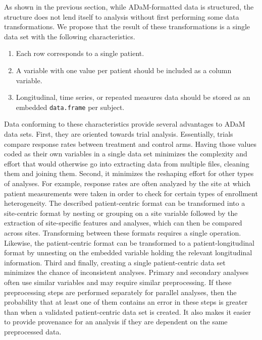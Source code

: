 As shown in the previous section, while ADaM-formatted data is
structured, the structure does not lend itself to analysis without first
performing some data transformations. We propose that the result of
these transformations is a single data set with the following
characteristics.

\begin{enumerate}
\def\labelenumi{\arabic{enumi}.}
\tightlist
\item
  Each row corresponds to a single patient.
\item
  A variable with one value per patient should be included as a column
  variable.
\item
  Longitudinal, time series, or repeated measures data should be stored
  as an embedded \texttt{data.frame} per subject.
\end{enumerate}

\noindent Data conforming to these characteristics provide several
advantages to ADaM data sets. First, they are oriented towards trial
analysis. Essentially, trials compare response rates between treatment
and control arms. Having those values coded as their own variables in a
single data set minimizes the complexity and effort that would otherwise
go into extracting data from multiple files, cleaning them and joining
them. Second, it minimizes the reshaping effort for other types of
analyses. For example, response rates are often analyzed by the site at
which patient measurements were taken in order to check for certain
types of enrollment heterogeneity. The described patient-centric format
can be transformed into a site-centric format by nesting or grouping on
a site variable followed by the extraction of site-specific features and
analyses, which can then be compared across sites. Transforming between
these formats requires a single operation. Likewise, the patient-centric
format can be transformed to a patient-longitudinal format by unnesting
on the embedded variable holding the relevant longitudinal information.
Third and finally, creating a single patient-centric data set minimizes
the chance of inconsistent analyses. Primary and secondary analyses
often use similar variables and may require similar preprocessing. If
these preprocessing steps are performed separately for parallel
analyses, then the probability that at least one of them contains an
error in these steps is greater than when a validated patient-centric
data set is created. It also makes it easier to provide provenance for
an analysis if they are dependent on the same preprocessed data.

